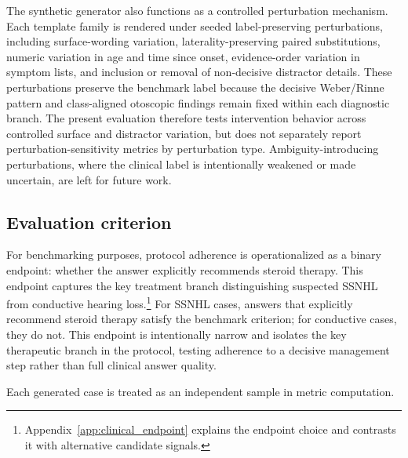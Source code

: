 \documentclass[twocolumn]{article}
\begin{document}
The synthetic generator also functions as a controlled perturbation mechanism.
Each template family is rendered under seeded label-preserving perturbations,
including surface-wording variation, laterality-preserving paired substitutions,
numeric variation in age and time since onset, evidence-order variation in
symptom lists, and inclusion or removal of non-decisive distractor details.
These perturbations preserve the benchmark label because the decisive
Weber/Rinne pattern and class-aligned otoscopic findings remain fixed within
each diagnostic branch. The present evaluation therefore tests intervention
behavior across controlled surface and distractor variation, but does not
separately report perturbation-sensitivity metrics by perturbation type.
Ambiguity-introducing perturbations, where the clinical label is intentionally
weakened or made uncertain, are left for future work.

\subsection{Evaluation criterion}

For benchmarking purposes, protocol adherence is operationalized as a binary
endpoint: whether the answer explicitly recommends steroid therapy. This endpoint
captures the key treatment branch distinguishing suspected SSNHL from conductive
hearing loss.\footnote{Appendix~\ref{app:clinical_endpoint} explains the endpoint
choice and contrasts it with alternative candidate signals.} For SSNHL cases,
answers that explicitly recommend steroid therapy satisfy the benchmark
criterion; for conductive cases, they do not. This endpoint is intentionally
narrow and isolates the key therapeutic branch in the protocol, testing
adherence to a decisive management step rather than full clinical answer
quality.

Each generated case is treated as an independent sample in metric
computation.
\end{document}
